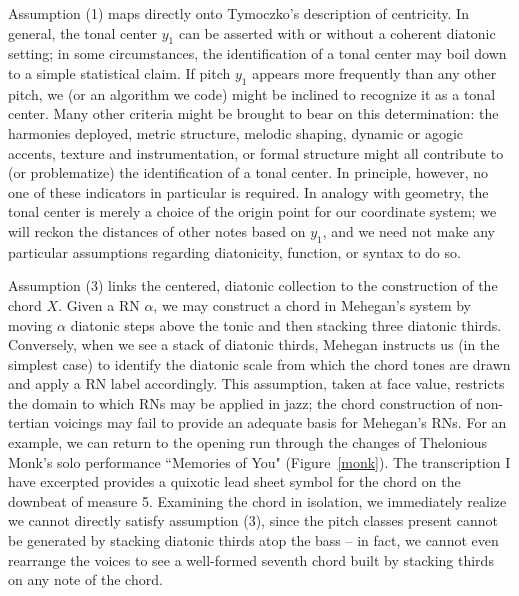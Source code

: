 Assumption (1) maps directly onto Tymoczko's description of centricity.  In general, the tonal center $y_1$ can be asserted with or without a coherent diatonic setting; in some circumstances, the identification of a tonal center may boil down to a simple statistical claim.  If pitch $y_1$ appears more frequently than any other pitch, we (or an algorithm we code) might be inclined to recognize it as a tonal center.  Many other criteria might be brought to bear on this determination: the harmonies deployed, metric structure, melodic shaping, dynamic or agogic accents, texture and instrumentation, or formal structure might all contribute to (or problematize) the identification of a tonal center.  In principle, however, no one of these indicators in particular is required.  In analogy with geometry, the tonal center is merely a choice of the origin point for our coordinate system; we will reckon the distances of other notes based on $y_1$, and we need not make any particular assumptions regarding diatonicity, function, or syntax to do so.

Assumption (3) links the centered, diatonic collection to the construction of the chord $X$.  Given a RN $\alpha$, we may construct a chord in Mehegan's system by moving $\alpha$ diatonic steps above the tonic and then stacking three diatonic thirds.  Conversely, when we see a stack of diatonic thirds, Mehegan instructs us (in the simplest case) to identify the diatonic scale from which the chord tones are drawn and apply a RN label accordingly.  This assumption, taken at face value, restricts the domain to which RNs may be applied in jazz; the chord construction of non-tertian voicings may fail to provide an adequate basis for Mehegan's RNs.  For an example, we can return to the opening run through the changes of Thelonious Monk's solo performance ``Memories of You" (Figure~\ref{monk}).  The transcription I have excerpted provides a quixotic lead sheet symbol for the chord on the downbeat of measure 5.  Examining the chord in isolation, we immediately realize we cannot directly satisfy assumption (3), since the pitch classes present cannot be generated by stacking diatonic thirds atop the bass -- in fact, we cannot even rearrange the voices to see a well-formed seventh chord built by stacking thirds on any note of the chord.

